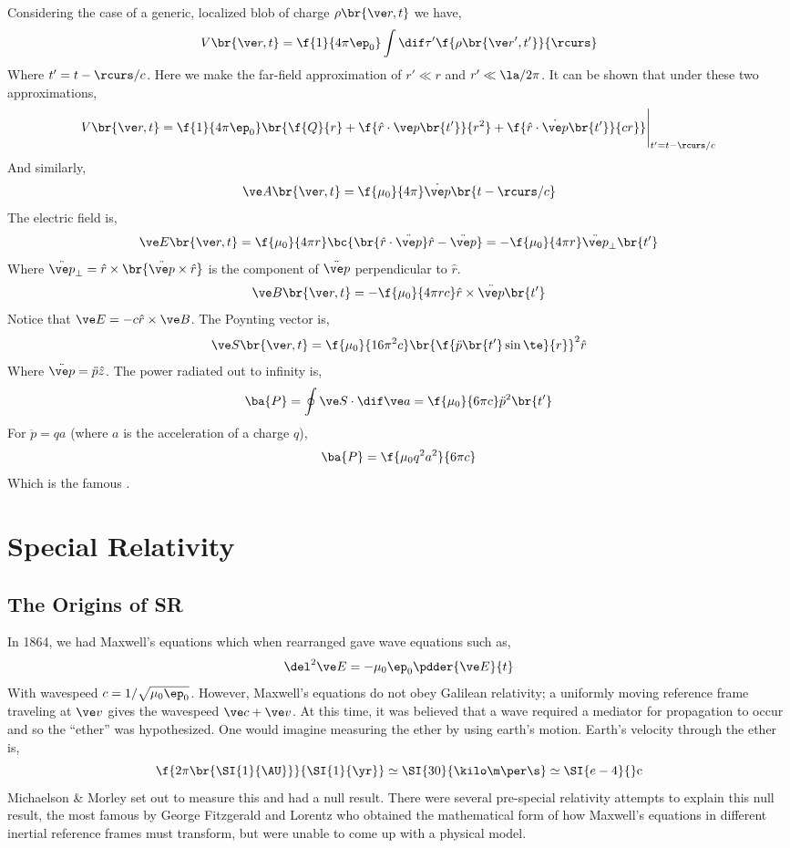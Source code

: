\documentclass{article}
\begin{document}
Considering the case of a generic, localized blob of charge $\rho\br{\ve r, t}$ we have,
\[ V\br{\ve r, t} = \f{1}{4 \pi \ep_0} \int \dif \tau' \f{\rho\br{\ve r', t'}}{\rcurs} \]
Where $t' = t - \rcurs / c$. Here we make the far-field approximation of $r' \ll r$ and $r' \ll \la / 2 \pi$. It can be shown that under these two approximations,
\[ V\br{\ve r, t} = \f{1}{4 \pi \ep_0} \br{\f{Q}{r} + \f{\hat r \cdot \ve p \br{t'}}{r^2} + \f{\hat r \cdot \dot {\ve p}\br{t'}}{cr}} \Bigg|_{t' = t - \rcurs / c} \]
And similarly,
\[ \ve A\br{\ve r, t} = \f{\mu_0}{4 \pi} \dot {\ve p}\br{t - \rcurs / c}  \]
The electric field is,
\[ \ve E\br{\ve r, t} = \f{\mu_0}{4 \pi r} \bc{\br{\hat r \cdot \ddot{\ve p}}\hat r - \ddot{\ve p}} = - \f{\mu_0}{4 \pi r} \ddot{\ve p}_{\perp}\br{t'} \]
Where $\ddot{\ve p}_{\perp} = \hat r \times \br{\ddot{\ve p} \times \hat r}$ is the component of $\ddot{\ve p}$ perpendicular to $\hat r$.
\[ \ve B\br{\ve r, t} = - \f{\mu_0}{4 \pi r c} \hat r \times \ddot{\ve p} \br{t'}  \]
Notice that $\ve E = - c \hat r \times \ve B$. The Poynting vector is,
\[ \ve S \br{\ve r, t} = \f{\mu_0}{16 \pi^2 c} \br{\f{\ddot p \br{t'} \sin \te }{r}}^2 \hat r\]
Where $\ddot{\ve p} = \ddot p \hat z$. The power radiated out to infinity is,
\[ \ba{P} = \oint \ve S \cdot \dif \ve a = \f{\mu_0}{6 \pi c} \ddot p^2 \br{t'} \]
For $\ddot p = q a$ (where $a$ is the acceleration of a charge $q$),
\[ \ba{P} = \f{\mu_0 q^2 a^2}{6 \pi c} \]
Which is the famous .

\section{Special Relativity}

\subsection{The Origins of SR}

In 1864, we had Maxwell's equations which when rearranged gave wave equations such as,
\[ \del^2 \ve E = - \mu_0 \ep_0 \pdder{\ve E}{t} \]
With wavespeed $c = 1 / \sqrt{\mu_0 \ep_0}$. However, Maxwell's equations do not obey Galilean relativity; a uniformly moving reference frame traveling at $\ve v$ gives the wavespeed $\ve c + \ve v$. At this time, it was believed that a wave required a mediator for propagation to occur and so the ``ether'' was hypothesized. One would imagine measuring the ether by using earth's motion. Earth's velocity through the ether is,
\[ \f{2 \pi \br{\SI{1}{\AU}}}{\SI{1}{\yr}} \simeq \SI{30}{\kilo\m\per\s} \simeq \SI{e-4}{}\text{c} \]
Michaelson \& Morley set out to measure this and had a null result. There were several pre-special relativity attempts to explain this null result, the most famous by George Fitzgerald and Lorentz who obtained the mathematical form of how Maxwell's equations in different inertial reference frames must transform, but were unable to come up with a physical model.\\
\end{document}

